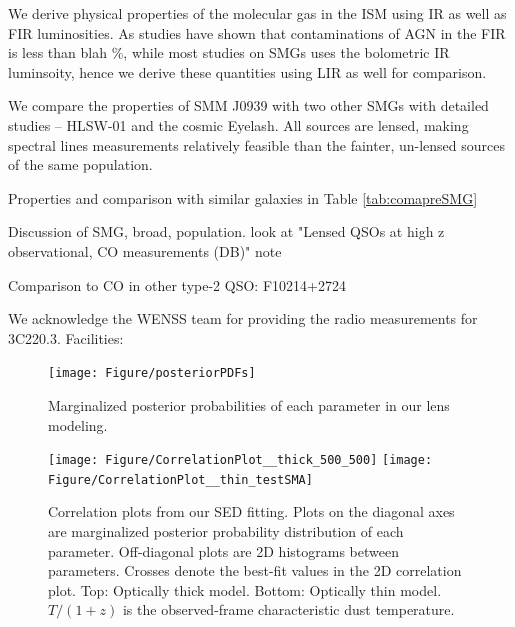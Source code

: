 \documentclass[twocolumn,apj,numberedappendix]{emulateapj}
\begin{document}
We derive physical properties of the molecular gas in the ISM using IR as well as FIR luminosities. As studies have shown that contaminations of AGN in the FIR is less than blah \%, while most studies on SMGs uses the bolometric IR luminsoity, hence we derive these quantities using LIR as well for comparison. 

We compare the properties of SMM J0939 with two other SMGs with detailed studies -- HLSW-01 and the cosmic Eyelash. All sources are lensed, making spectral lines measurements relatively feasible than the fainter, un-lensed sources of the same population.

Properties and comparison with similar galaxies in Table \ref{tab:comapreSMG}

Discussion of SMG, broad, population.
look at "Lensed QSOs at high z observational, CO measurements (DB)" note

Comparison to CO in other type-2 QSO: F10214+2724 \citep{Riechers11a}

\acknowledgments

We acknowledge the WENSS team for providing the radio measurements for 3C220.3.
Facilities: 




\appendix

\begin{figure}[!tbp]
\centering
\texttt{[image: Figure/posteriorPDFs]}
\caption{Marginalized posterior probabilities of each parameter in our lens modeling.
\label{fig:LensPDF}}
\end{figure}

\begin{figure}[!tbp]
\centering
\texttt{[image: Figure/CorrelationPlot\_\_thick\_500\_500]}
\texttt{[image: Figure/CorrelationPlot\_\_thin\_testSMA]}
\caption{Correlation plots from our SED fitting. Plots on the diagonal axes are marginalized posterior probability 
distribution of each
parameter. Off-diagonal plots are 2D histograms between parameters. Crosses denote the best-fit values in 
the 2D correlation plot. Top: Optically thick
model. Bottom: Optically thin model. $T/(1+z)$ is the observed-frame characteristic dust temperature.
\label{fig:sedlikelihood}}
\end{figure}
\end{document}

